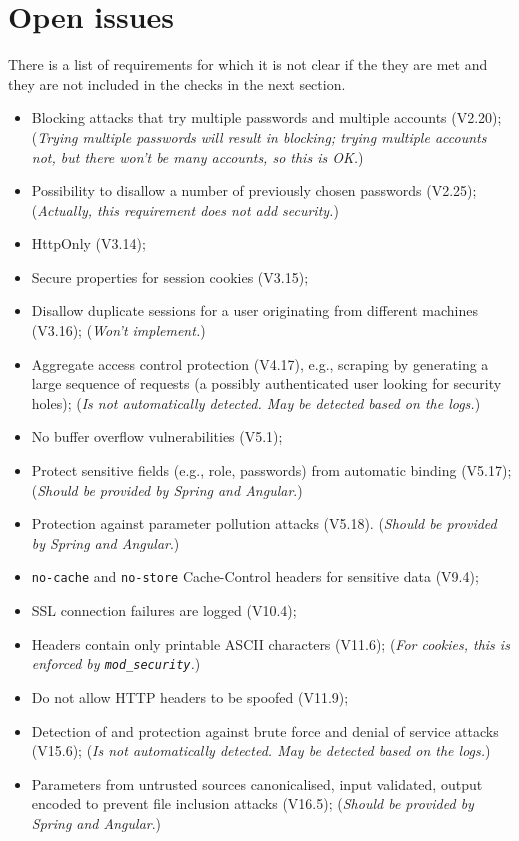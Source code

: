 \documentclass[a4paper]{report}
\begin{document}
\section{Open issues}\label{section:issues}

There is a list of requirements for which it is not clear if the they are met and
they are not included in the checks in the next section.

\begin{itemize}
\item Blocking attacks that try multiple passwords and multiple accounts (V2.20);
(\textit{Trying multiple passwords will result in blocking; trying multiple accounts not, but there won't be many accounts, so this is OK.})
\item Possibility to disallow a number of previously chosen passwords (V2.25);
(\textit{Actually, this requirement does not add security.})
\item HttpOnly (V3.14);
\item Secure properties for session cookies (V3.15);
\item Disallow duplicate sessions for a user originating from different machines (V3.16);
(\textit{Won't implement.})
\item Aggregate access control protection  (V4.17), e.g., scraping by generating 
a large sequence of requests (a possibly authenticated user looking for security holes);
(\textit{Is not automatically detected. May be detected based on the logs.})
\item No buffer overflow vulnerabilities (V5.1);
\item Protect sensitive fields (e.g., role, passwords) from automatic binding (V5.17);
(\textit{Should be provided by Spring and Angular}.)
\item Protection against parameter pollution attacks (V5.18).
(\textit{Should be provided by Spring and Angular}.)
\item \texttt{no-cache} and \texttt{no-store} Cache-Control headers for sensitive data (V9.4);
\item SSL connection failures are logged (V10.4);
\item Headers contain only printable ASCII characters (V11.6); 
(\textit{For cookies, this is enforced by \texttt{mod\_security}.})
\item Do not allow HTTP headers to be spoofed (V11.9);
\item Detection of and protection against brute force and denial of service attacks (V15.6);
(\textit{Is not automatically detected. May be detected based on the logs.})
\item Parameters from untrusted sources canonicalised, input validated, output encoded
to prevent file inclusion attacks (V16.5);
(\textit{Should be provided by Spring and Angular}.)
\end{itemize}
\end{document}
